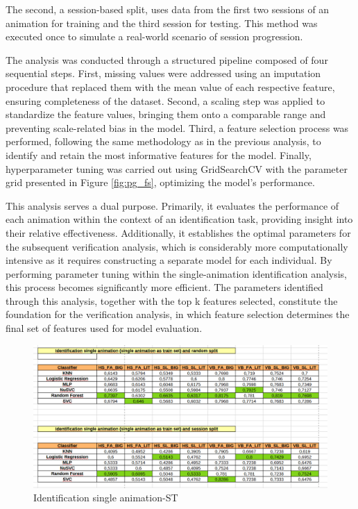 \documentclass{article}
\begin{document}
The second, a session-based split, uses data from the first two sessions of an animation for training and the third session for testing. 
This method was executed once to simulate a real-world scenario of session progression.

The analysis was conducted through a structured pipeline composed of four sequential steps. 
First, missing values were addressed using an imputation procedure that replaced them with the mean value of each respective feature, ensuring completeness of the dataset. 
Second, a scaling step was applied to standardize the feature values, bringing them onto a comparable range and preventing scale-related bias in the model. 
Third, a feature selection process was performed, following the same methodology as in the previous analysis, to identify and retain the most informative features for the model. 
Finally, hyperparameter tuning was carried out using GridSearchCV with the parameter grid presented in Figure \ref{fig:pg_fs}, optimizing the model's performance.

This analysis serves a dual purpose. 
Primarily, it evaluates the performance of each animation within the context of an identification task, providing insight into their relative effectiveness. 
Additionally, it establishes the optimal parameters for the subsequent verification analysis, which is considerably more computationally intensive as it requires constructing a separate model for each individual. 
By performing parameter tuning within the single-animation identification analysis, this process becomes significantly more efficient. 
The parameters identified through this analysis, together with the top k features selected, constitute the foundation for the verification analysis, in which feature selection determines the final set of features used for model evaluation.

\begin{figure}[ht]
    \centering
    \includegraphics[width = 0.8
    \textwidth]{Images/Results/Identification_single/single_id_st.png}
    \caption{Identification single animation-ST}
    \label{fig:id_s_st}
\end{figure}
\end{document}
